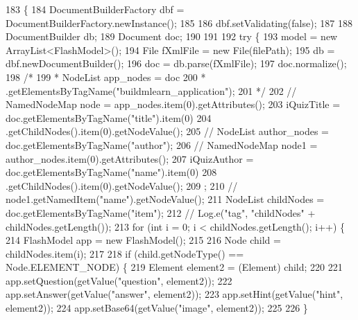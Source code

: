 \begin{DoxyCode}
183                                          \{
184         DocumentBuilderFactory dbf = DocumentBuilderFactory.newInstance();
185 
186         dbf.setValidating(\textcolor{keyword}{false});
187 
188         DocumentBuilder db;
189         Document doc;
190 
191 
192         \textcolor{keywordflow}{try} \{
193             model = \textcolor{keyword}{new} ArrayList<FlashModel>();
194             File fXmlFile = \textcolor{keyword}{new} File(filePath);
195             db = dbf.newDocumentBuilder();
196             doc = db.parse(fXmlFile);
197             doc.normalize();
198             \textcolor{comment}{/*}
199 \textcolor{comment}{             * NodeList app\_nodes = doc}
200 \textcolor{comment}{             * .getElementsByTagName("buildmlearn\_application");}
201 \textcolor{comment}{             */}
202             \textcolor{comment}{// NamedNodeMap node = app\_nodes.item(0).getAttributes();}
203             iQuizTitle = doc.getElementsByTagName(\textcolor{stringliteral}{"title"}).item(0)
204                     .getChildNodes().item(0).getNodeValue();
205             \textcolor{comment}{// NodeList author\_nodes = doc.getElementsByTagName("author");}
206             \textcolor{comment}{// NamedNodeMap node1 = author\_nodes.item(0).getAttributes();}
207             iQuizAuthor = doc.getElementsByTagName(\textcolor{stringliteral}{"name"}).item(0)
208                     .getChildNodes().item(0).getNodeValue();
209             ;
210             \textcolor{comment}{// node1.getNamedItem("name").getNodeValue();}
211             NodeList childNodes = doc.getElementsByTagName(\textcolor{stringliteral}{"item"});
212             \textcolor{comment}{// Log.e("tag", "childNodes" + childNodes.getLength());}
213             \textcolor{keywordflow}{for} (\textcolor{keywordtype}{int} i = 0; i < childNodes.getLength(); i++) \{
214                 FlashModel app = \textcolor{keyword}{new} FlashModel();
215 
216                 Node child = childNodes.item(i);
217 
218                 \textcolor{keywordflow}{if} (child.getNodeType() == Node.ELEMENT\_NODE) \{
219                     Element element2 = (Element) child;
220 
221                     app.setQuestion(getValue(\textcolor{stringliteral}{"question"}, element2));
222                     app.setAnswer(getValue(\textcolor{stringliteral}{"answer"}, element2));
223                     app.setHint(getValue(\textcolor{stringliteral}{"hint"}, element2));
224                     app.setBase64(getValue(\textcolor{stringliteral}{"image"}, element2));
225 
226                 \}

\end{DoxyCode}
